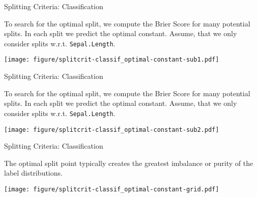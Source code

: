 \documentclass[11pt,compress,t,notes=noshow, xcolor=table]{beamer}
\begin{document}
\begin{vbframe}{Splitting Criteria: Classification}

To search for the optimal split, we compute the Brier Score for many potential splits.
In each split we predict the optimal constant.
Assume, that we only consider splits w.r.t. \texttt{Sepal.Length}.

\texttt{[image: figure/splitcrit-classif\_optimal-constant-sub1.pdf]}

\end{vbframe}

\begin{vbframe}{Splitting Criteria: Classification}

To search for the optimal split, we compute the Brier Score for many potential splits.
In each split we predict the optimal constant.
Assume, that we only consider splits w.r.t. \texttt{Sepal.Length}.

\texttt{[image: figure/splitcrit-classif\_optimal-constant-sub2.pdf]}

\end{vbframe}

\begin{vbframe}{Splitting Criteria: Classification}

The optimal split point typically creates the greatest imbalance or purity of the label distributions.
\lz

\texttt{[image: figure/splitcrit-classif\_optimal-constant-grid.pdf]}

\end{vbframe}
\end{document}
